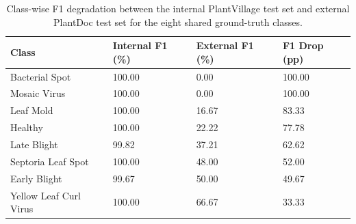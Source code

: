 \begin{table}
\caption{Class-wise F1 degradation between the internal PlantVillage test set and external PlantDoc test set for the eight shared ground-truth classes.}
\label{tab:shared8_classwise}
\begin{tabular}{llll}
\toprule
Class & Internal F1 (\%) & External F1 (\%) & F1 Drop (pp) \\
\midrule
Bacterial Spot & 100.00 & 0.00 & 100.00 \\
Mosaic Virus & 100.00 & 0.00 & 100.00 \\
Leaf Mold & 100.00 & 16.67 & 83.33 \\
Healthy & 100.00 & 22.22 & 77.78 \\
Late Blight & 99.82 & 37.21 & 62.62 \\
Septoria Leaf Spot & 100.00 & 48.00 & 52.00 \\
Early Blight & 99.67 & 50.00 & 49.67 \\
Yellow Leaf Curl Virus & 100.00 & 66.67 & 33.33 \\
\bottomrule
\end{tabular}
\end{table}
